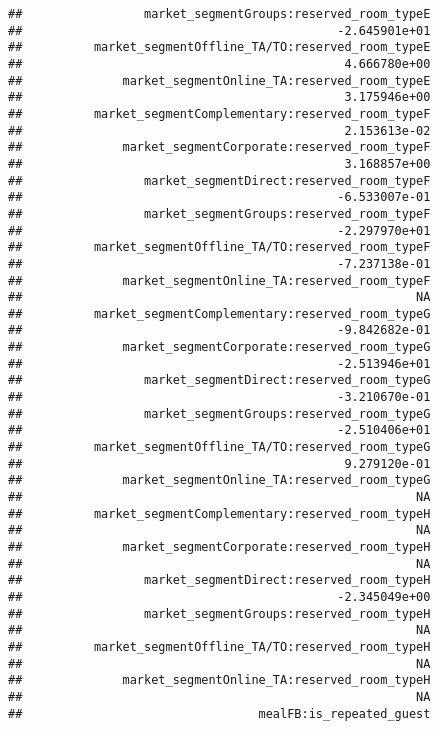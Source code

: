 \documentclass[
]{article}
\begin{document}
\begin{verbatim}
##                 market_segmentGroups:reserved_room_typeE 
##                                            -2.645901e+01 
##          market_segmentOffline_TA/TO:reserved_room_typeE 
##                                             4.666780e+00 
##              market_segmentOnline_TA:reserved_room_typeE 
##                                             3.175946e+00 
##          market_segmentComplementary:reserved_room_typeF 
##                                             2.153613e-02 
##              market_segmentCorporate:reserved_room_typeF 
##                                             3.168857e+00 
##                 market_segmentDirect:reserved_room_typeF 
##                                            -6.533007e-01 
##                 market_segmentGroups:reserved_room_typeF 
##                                            -2.297970e+01 
##          market_segmentOffline_TA/TO:reserved_room_typeF 
##                                            -7.237138e-01 
##              market_segmentOnline_TA:reserved_room_typeF 
##                                                       NA 
##          market_segmentComplementary:reserved_room_typeG 
##                                            -9.842682e-01 
##              market_segmentCorporate:reserved_room_typeG 
##                                            -2.513946e+01 
##                 market_segmentDirect:reserved_room_typeG 
##                                            -3.210670e-01 
##                 market_segmentGroups:reserved_room_typeG 
##                                            -2.510406e+01 
##          market_segmentOffline_TA/TO:reserved_room_typeG 
##                                             9.279120e-01 
##              market_segmentOnline_TA:reserved_room_typeG 
##                                                       NA 
##          market_segmentComplementary:reserved_room_typeH 
##                                                       NA 
##              market_segmentCorporate:reserved_room_typeH 
##                                                       NA 
##                 market_segmentDirect:reserved_room_typeH 
##                                            -2.345049e+00 
##                 market_segmentGroups:reserved_room_typeH 
##                                                       NA 
##          market_segmentOffline_TA/TO:reserved_room_typeH 
##                                                       NA 
##              market_segmentOnline_TA:reserved_room_typeH 
##                                                       NA 
##                                 mealFB:is_repeated_guest 

\end{verbatim}
\end{document}
